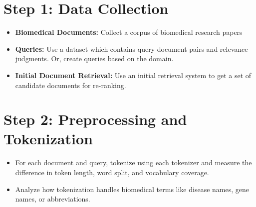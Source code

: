 
\section*{Step 1: Data Collection}
\begin{itemize}
    \item \textbf{Biomedical Documents:} Collect a corpus of biomedical research papers
    \item \textbf{Queries:} Use a dataset which contains query-document pairs and relevance judgments. Or, create queries based on the domain.
    \item \textbf{Initial Document Retrieval:} Use an initial retrieval system to get a set of candidate documents for re-ranking.
\end{itemize}

\section*{Step 2: Preprocessing and Tokenization}
\begin{itemize}
    \item For each document and query, tokenize using each tokenizer and measure the difference in token length, word split, and vocabulary coverage.
    \item Analyze how tokenization handles biomedical terms like disease names, gene names, or abbreviations.
\end{itemize}

